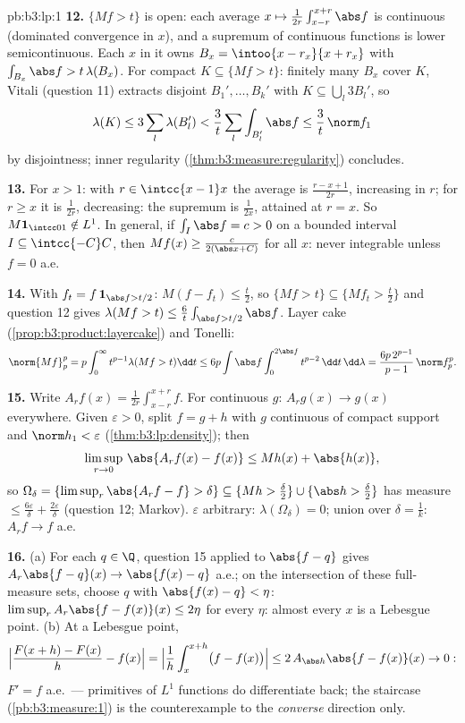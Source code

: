 \begin{solution}{pb:b3:lp:1}
\textbf{12.} $\{Mf > t\}$ is open: each average $x \mapsto
\frac1{2r}\int_{x-r}^{x+r}\abs f$ is continuous (dominated
convergence in $x$), and a supremum of continuous functions
is lower semicontinuous. Each $x$ in it owns $B_x =
\intoo{x-r_x}{x+r_x}$ with $\int_{B_x}\abs f >
t\,\lambda(B_x)$. For compact $K \subseteq \{Mf > t\}$:
finitely many $B_x$ cover $K$, Vitali (question 11) extracts
disjoint $B_1', \dots, B_k'$ with $K \subseteq
\bigcup_l3B_l'$, so
\[
\lambda(K) \leq 3\sum_l\lambda(B_l') <
\frac3t\sum_l\int_{B_l'}\abs f \leq \frac3t\,\norm f_1
\]
by disjointness; inner regularity
(\cref{thm:b3:measure:regularity}) concludes.

\textbf{13.} For $x > 1$: with $r \in \intcc{x-1}x$ the
average is $\frac{r - x + 1}{2r}$, increasing in $r$; for $r
\geq x$ it is $\frac1{2r}$, decreasing: the supremum is
$\frac1{2x}$, attained at $r = x$. So $M\mathbf 1_{\intcc01}
\notin L^1$. In general, if $\int_I\abs f = c > 0$ on a
bounded interval $I \subseteq \intcc{-C}C$, then $Mf(x) \geq
\frac{c}{2(\abs x + C)}$ for all $x$: never integrable
unless $f = 0$ a.e.

\textbf{14.} With $f_t = f\,\mathbf 1_{\abs f > t/2}$:
$M(f - f_t) \leq \frac t2$, so $\{Mf > t\} \subseteq \{Mf_t
> \frac t2\}$ and question 12 gives $\lambda(Mf > t) \leq
\frac6t\int_{\abs f > t/2}\abs f$. Layer cake
(\cref{prop:b3:product:layercake}) and Tonelli:
\[
\norm{Mf}_p^p = p\int_0^\infty t^{p-1}\lambda(Mf > t)\dd t
\leq 6p\int\abs f\int_0^{2\abs f}t^{p-2}\,\dd t\,\dd\lambda
= \frac{6p\,2^{p-1}}{p-1}\,\norm f_p^p .
\]

\textbf{15.} Write $A_rf(x) = \frac1{2r}\int_{x-r}^{x+r}f$.
For continuous $g$: $A_rg(x) \to g(x)$ everywhere. Given
$\varepsilon > 0$, split $f = g + h$ with $g$ continuous of
compact support and $\norm h_1 < \varepsilon$
(\cref{thm:b3:lp:density}); then
\[
\limsup_{r\to0}\,\abs{A_rf(x) - f(x)} \leq Mh(x) +
\abs{h(x)},
\]
so $\Omega_\delta = \{\limsup_r\abs{A_rf - f} > \delta\}
\subseteq \{Mh > \tfrac\delta2\} \cup \{\abs h >
\tfrac\delta2\}$ has measure $\leq \frac{6\varepsilon}\delta
+ \frac{2\varepsilon}\delta$ (question 12; Markov).
$\varepsilon$ arbitrary: $\lambda(\Omega_\delta) = 0$; union
over $\delta = \frac1k$: $A_rf \to f$ a.e.

\textbf{16.} (a) For each $q \in \Q$, question 15 applied to
$\abs{f - q}$ gives $A_r\abs{f - q}(x) \to \abs{f(x) - q}$
a.e.; on the intersection of these full-measure sets, choose
$q$ with $\abs{f(x) - q} < \eta$:
$\limsup_rA_r\abs{f - f(x)}(x) \leq 2\eta$ for every $\eta$:
almost every $x$ is a Lebesgue point. (b) At a Lebesgue
point,
\[
\Bigl|\frac{F(x + h) - F(x)}h - f(x)\Bigr|
= \Bigl|\frac1h\int_x^{x+h}\bigl(f - f(x)\bigr)\Bigr|
\leq 2\,A_{\abs h}\abs{f - f(x)}(x) \to 0 :
\]
$F' = f$ a.e.\ --- primitives of $L^1$ functions do
differentiate back; the staircase (\cref{pb:b3:measure:1})
is the counterexample to the \emph{converse} direction only.


\end{solution}

